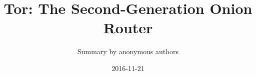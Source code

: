 \documentclass[11pt,twocolumn,a4paper,DIV=calc]{scrartcl}
\begin{document}
\title{Tor: The Second-Generation Onion Router}
\author{Summary by anonymous authors}
\date{2016-11-21}

\maketitle






 

\end{document}
